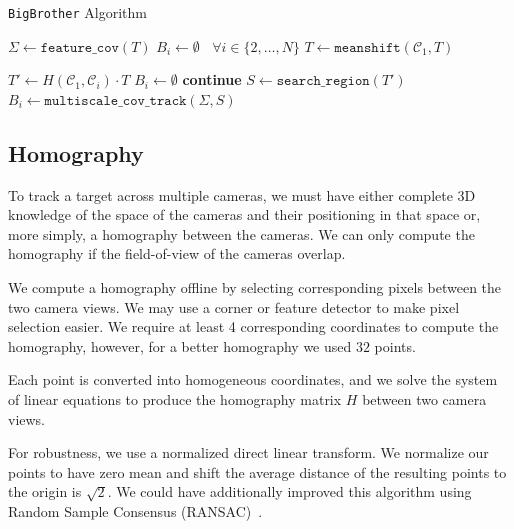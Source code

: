 \documentclass{article}
\begin{document}
\begin{algorithm}
\caption{\texttt{BigBrother} Algorithm}\label{algo:bigbrother}
\begin{algorithmic}[1]
\State $\Sigma\gets \mathtt{feature\_cov}(T)$
\State $B_i\gets\emptyset~~~~\forall i\in\{2,\dots,N\}$
    \State $T\gets \mathtt{meanshift}(\mathcal{C}_1, T)$

        \State $T'\gets H(\mathcal{C}_1, \mathcal{C}_i)\cdot T$
            \State $B_i\gets\emptyset$
            \State \textbf{continue}
        \EndIf
        \State $S\gets\mathtt{search\_region}(T')$
        \State $B_i\gets\mathtt{multiscale\_cov\_track}(\Sigma, S)$
    \EndFor
\EndWhile
\EndProcedure
\end{algorithmic}
\end{algorithm}

\subsection{Homography}
\label{sec:homography}
To track a target across multiple cameras, we must have either complete 3D knowledge of the space of the cameras and their positioning in that space or, more simply, a homography between the cameras. We can only compute the homography if the field-of-view of the cameras overlap.

We compute a homography offline by selecting corresponding pixels between the two camera views. We may use a corner or feature detector to make pixel selection easier. We require at least 4 corresponding coordinates to compute the homography, however, for a better homography we used $32$ points.

Each point is converted into homogeneous coordinates, and we solve the system of linear equations to produce the homography matrix $H$ between two camera views.

For robustness, we use a normalized direct linear transform. We normalize our points to have zero mean and shift the average distance of the resulting points to the origin is $\sqrt{2}$. We could have additionally improved this algorithm using Random Sample Consensus (RANSAC)~\cite{fischler1981random}.
\end{document}
